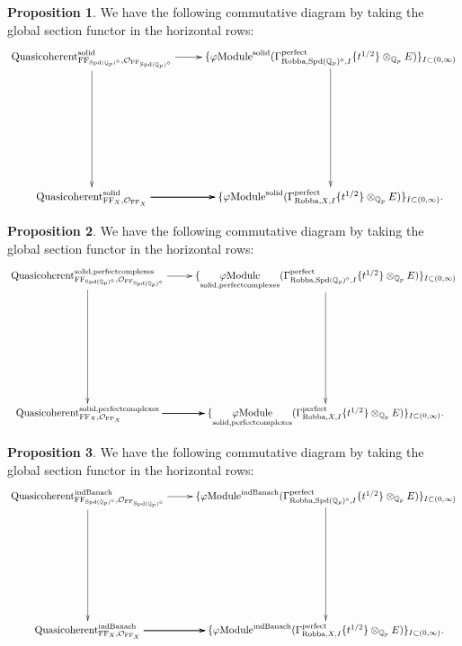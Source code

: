 \documentclass[12pt]{book}
\theoremstyle{definition}
\newtheorem{proposition}{Proposition}
\begin{document}
\begin{proposition}
We have the following commutative diagram by taking the global section functor in the horizontal rows:\\
\[\displayindent=+0in
\xymatrix@R+7pc{
\mathrm{Quasicoherent}^{\mathrm{solid}}_{\mathrm{FF}_{\mathrm{Spd}(\mathbb{Q}_p)^\diamond},\mathcal{O}_{\mathrm{FF}_{\mathrm{Spd}(\mathbb{Q}_p)^\diamond}}} \ar[r] \ar[d] &\{\varphi\mathrm{Module}^{\mathrm{solid}}(\Gamma^\text{perfect}_{\text{Robba},{\mathrm{Spd}(\mathbb{Q}_p)^\diamond},I}\{t^{1/2}\}\otimes_{\mathbb{Q}_p}E)\}_{I\subset (0,\infty)} \ar[d]\\
\mathrm{Quasicoherent}^{\mathrm{solid}}_{\mathrm{FF}_X,\mathcal{O}_{\mathrm{FF}_X}}  \ar[r] \ar[r] \ar[r] &\{\varphi\mathrm{Module}^{\mathrm{solid}}(\Gamma^\text{perfect}_{\text{Robba},X,I}\{t^{1/2}\}\otimes_{\mathbb{Q}_p}E)\}_{I\subset (0,\infty)}.  \\  
}
\]
\end{proposition}

\begin{proposition}
We have the following commutative diagram by taking the global section functor in the horizontal rows:\\
\[\displayindent=+0in
\xymatrix@R+7pc{
\mathrm{Quasicoherent}^{\mathrm{solid,perfectcomplexes}}_{\mathrm{FF}_{\mathrm{Spd}(\mathbb{Q}_p)^\diamond},\mathcal{O}_{\mathrm{FF}_{\mathrm{Spd}(\mathbb{Q}_p)^\diamond}}} \ar[r] \ar[d] &\{\underset{\mathrm{solid,perfectcomplexes}}{\varphi\mathrm{Module}}(\Gamma^\text{perfect}_{\text{Robba},{\mathrm{Spd}(\mathbb{Q}_p)^\diamond},I}\{t^{1/2}\}\otimes_{\mathbb{Q}_p}E)\}_{I\subset (0,\infty)} \ar[d]  \\
\mathrm{Quasicoherent}^{\mathrm{solid,perfectcomplexes}}_{\mathrm{FF}_X,\mathcal{O}_{\mathrm{FF}_X}}  \ar[r] \ar[r] \ar[r] &\{\underset{\mathrm{solid,perfectcomplexes}}{\varphi\mathrm{Module}}(\Gamma^\text{perfect}_{\text{Robba},X,I}\{t^{1/2}\}\otimes_{\mathbb{Q}_p}E)\}_{I\subset (0,\infty)}.   
}
\]
\end{proposition}

\begin{proposition}
We have the following commutative diagram by taking the global section functor in the horizontal rows:\\
\[\displayindent=+0in
\xymatrix@R+7pc{
\mathrm{Quasicoherent}^{\mathrm{indBanach}}_{\mathrm{FF}_{\mathrm{Spd}(\mathbb{Q}_p)^\diamond},\mathcal{O}_{\mathrm{FF}_{\mathrm{Spd}(\mathbb{Q}_p)^\diamond}}} \ar[r] \ar[d] &\{\varphi\mathrm{Module}^\text{indBanach}(\Gamma^\text{perfect}_{\text{Robba},{\mathrm{Spd}(\mathbb{Q}_p)^\diamond},I}\{t^{1/2}\}\otimes_{\mathbb{Q}_p}E)\}_{I\subset (0,\infty)}\ar[d]\\
\mathrm{Quasicoherent}^{\mathrm{indBanach}}_{\mathrm{FF}_X,\mathcal{O}_{\mathrm{FF}_X}}  \ar[r] \ar[r] \ar[r] &\{\varphi\mathrm{Module}^{\mathrm{indBanach}}(\Gamma^\text{perfect}_{\text{Robba},X,I}\{t^{1/2}\}\otimes_{\mathbb{Q}_p}E)\}_{I\subset (0,\infty)}.    
}
\]
\end{proposition}
\end{document}
